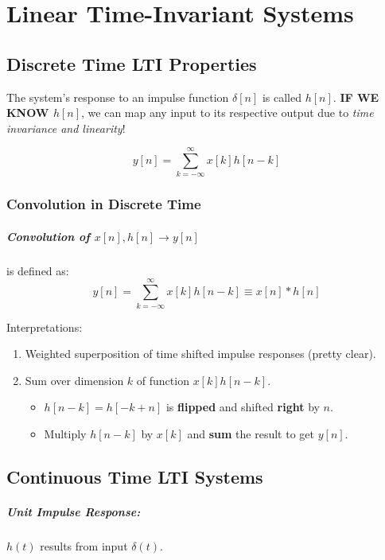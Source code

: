 \documentclass[a4paper,12pt]{report}
\begin{document}
\chapter{Linear Time-Invariant Systems}

\section{Discrete Time LTI Properties}

The system's response to an impulse function $\delta[n]$ is called $h[n]$. \textbf{IF WE KNOW $h[n]$}, we can map any input to its respective output due to \textit{time invariance and linearity}!

\begin{equation}
y[n] = \sum_{k=-\infty}^{\infty} x[k] h[n-k]
\end{equation}

\subsection{Convolution in Discrete Time}

\paragraph{Convolution of $x[n], h[n] \to y[n]$ } is defined as: 
\begin{equation}
y[n] = \sum_{k=-\infty}^{\infty} x[k] h[n-k] \equiv x[n] * h[n]
\end{equation}


Interpretations:
\begin{enumerate}
\item Weighted superposition of time shifted impulse responses (pretty clear).
\item Sum over dimension $k$ of function $x[k]h[n-k]$.
\begin{itemize}
\item $h[n-k] = h[-k+n]$ is \textbf{flipped} and shifted \textbf{right} by $n$.
\item Multiply $h[n-k]$ by $x[k]$ and \textbf{sum} the result to get $y[n]$.
\end{itemize}
\end{enumerate}


\section{Continuous Time LTI Systems}

\paragraph{Unit Impulse Response: } $h(t)$ results from input $\delta(t)$. 
\end{document}
